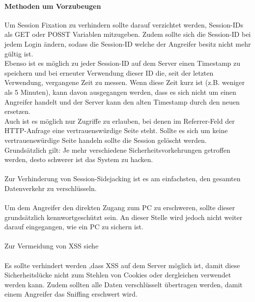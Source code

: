 \paragraph{Methoden um Vorzubeugen}
Um Session Fixation zu verhindern sollte darauf verzichtet werden, Session-IDs als GET oder POSST Variablen mitzugeben. Zudem sollte sich die Session-ID bei jedem Login ändern, sodass die Session-ID welche der Angreifer besitz nicht mehr gültig ist.\\ Ebenso ist es möglich zu jeder Session-ID auf dem Server einen Timestamp zu speichern und bei erneuter Verwendung dieser ID die, seit der letzten Verwendung, vergangene Zeit zu messen. Wenn diese Zeit kurz ist (z.B. weniger als 5 Minuten), kann davon ausgegangen werden, dass es sich nicht um einen Angreifer handelt und der Server kann den alten Timestamp durch den neuen ersetzen.\\ Auch ist es möglich nur Zugriffe zu erlauben, bei denen im Referrer-Feld der HTTP-Anfrage eine vertrauenswürdige Seite steht. Sollte es sich um keine vertrauenswürdige Seite handeln sollte die Session gelöscht werden.\\
Grundsätzlich gilt: Je mehr verschiedene Sicherheitsvorkehrungen getroffen werden, desto schwerer ist das System zu hacken.\\\\
Zur Verhinderung von Session-Sidejacking ist es am einfachsten, den gesamten Datenverkehr zu verschlüsseln. \\\\
Um dem Angreifer den direkten Zugang zum PC zu erschweren, sollte dieser grundsätzlich kennwortgeschützt sein. An dieser Stelle wird jedoch nicht weiter darauf eingegangen, wie ein PC zu sichern ist.\\\\
Zur Vermeidung von XSS siehe 
\\\\Es sollte verhindert werden ,dass XSS auf dem Server möglich ist, damit diese Sicherheitslücke nicht zum Stehlen von Cookies oder dergleichen verwendet werden kann. Zudem sollten alle Daten verschlüsselt übertragen werden, damit einem Angreifer das Sniffing erschwert wird.